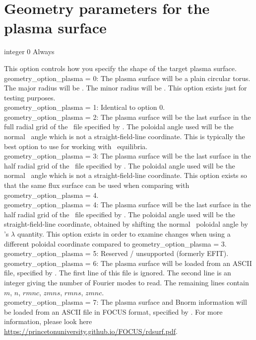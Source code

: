 \section{Geometry parameters for the plasma surface}

{integer}
{0}
{Always}
{This option controls how you specify the shape of the target plasma surface.\\

{\ttfamily geometry\_option\_plasma} = 0: The plasma surface will be a plain circular torus. The major radius will be .
     The minor radius will be . This option exists just for testing purposes.\\

{\ttfamily geometry\_option\_plasma} = 1: Identical to option 0.\\

{\ttfamily geometry\_option\_plasma} = 2: The plasma surface will be the last surface in the full radial grid of the \vmec~file specified by .
The poloidal angle used will be the normal \vmec~angle which is not a straight-field-line coordinate.
This is typically the best option to use for working with \vmec~equilibria.\\

{\ttfamily geometry\_option\_plasma} = 3: The plasma surface will be the last surface in the half radial grid of the \vmec~file specified by .
The poloidal angle used will be the normal \vmec~angle which is not a straight-field-line coordinate.
This option exists so that the same flux surface can be used when comparing with {\ttfamily geometry\_option\_plasma} = 4.\\

{\ttfamily geometry\_option\_plasma} = 4: The plasma surface will be the last surface in the half radial grid of the \vmec~file specified by .
The poloidal angle used will be the straight-field-line coordinate, obtained by shifting the normal \vmec~poloidal angle by \vmec's $\lambda$ quantity.
This option exists in order to examine changes when using a different poloidal coordinate compared to {\ttfamily geometry\_option\_plasma} = 3.\\

{\ttfamily geometry\_option\_plasma} = 5: Reserved / unsupported (formerly EFIT).\\

{\ttfamily geometry\_option\_plasma} = 6: The plasma surface will be loaded from an ASCII file, specified by . The first line of this file is ignored. The second line is an integer giving the number of Fourier modes
to read. The remaining lines contain $m$, $n$, $rmnc$, $zmns$, $rmns$, $zmnc$. \\

{\ttfamily geometry\_option\_plasma} = 7: The plasma surface and Bnorm information will be loaded from an ASCII file in FOCUS format, specified by . For more information, please look here \url{https://princetonuniversity.github.io/FOCUS/rdsurf.pdf}.

}

